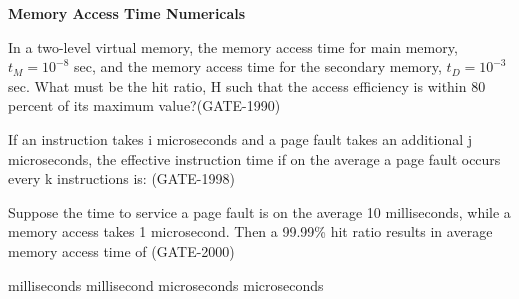 \centerline{\textbf{ \LARGE Memory Access Time Numericals}}




\begin{questyle}

  \question  In a two-level virtual memory, the memory access time for main memory,   {\large \(  t_{M}=10^{-8}  \) }  sec, and the memory access time for
            the secondary memory,  {\large \( t_D=10^{-3} \) }  sec. What must be the hit ratio, H such that the access efficiency is within 80 percent
            of its maximum value?(GATE-1990)

\end{questyle}


\begin{questyle}

  \question  If an instruction takes i microseconds and a page fault takes an additional j microseconds, the effective
              instruction time if on the average a  page fault occurs every k instructions is: (GATE-1998)

  \begin{choices}
  \end{choices}

\end{questyle}


\begin{questyle}

  \question  Suppose the time to service a page fault is on the average 10 milliseconds, while a memory access takes 1 microsecond.
             Then a 99.99\% hit ratio results in average memory access time of (GATE-2000)

  \begin{choices}
     milliseconds
     millisecond
     microseconds
     microseconds
  \end{choices}

\end{questyle}

